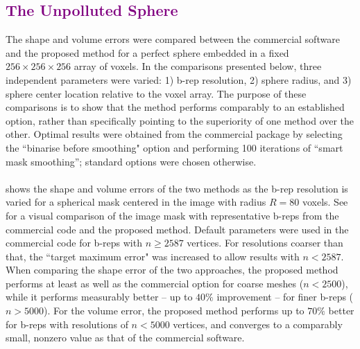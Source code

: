 \subsection{\textcolor{purple}{The Unpolluted Sphere}}
\label{The Unpolluted Sphere}

The shape and volume errors were compared between the commercial software and the proposed method for a perfect sphere embedded in a fixed $256 \times 256 \times 256$ array of voxels.  In the comparisons presented below, three independent parameters were varied:  1) b-rep resolution, 2) sphere radius, and 3) sphere center location relative to the voxel array. The purpose of these comparisons is to show that the method performs comparably to an established option, rather than specifically pointing to the superiority of one method over the other. Optimal results were obtained from the commercial package by selecting the ``binarise before smoothing" option and performing 100 iterations of ``smart mask smoothing''; standard options were chosen otherwise. \\ \\
%
 shows the shape and volume errors of the two methods as the b-rep resolution is varied for a spherical mask centered in the image with radius $R = 80$ voxels. See~ for a visual comparison of the image mask with representative b-reps from the commercial code and the proposed method. Default parameters were used in the commercial code for b-reps with $n \ge 2587$ vertices. For resolutions coarser than that, the ``target maximum error" was increased to allow results with $n < 2587$. When comparing the shape error of the two approaches, the proposed method performs at least as well as the commercial option for coarse meshes ($n < 2500$), while it performs measurably better -- up to $40\%$ improvement -- for finer b-reps ($n > 5000$). For the volume error, the proposed method performs up to $70\%$ better for b-reps with resolutions of $n < 5000$ vertices, and converges to a comparably small, nonzero value as that of the commercial software.
